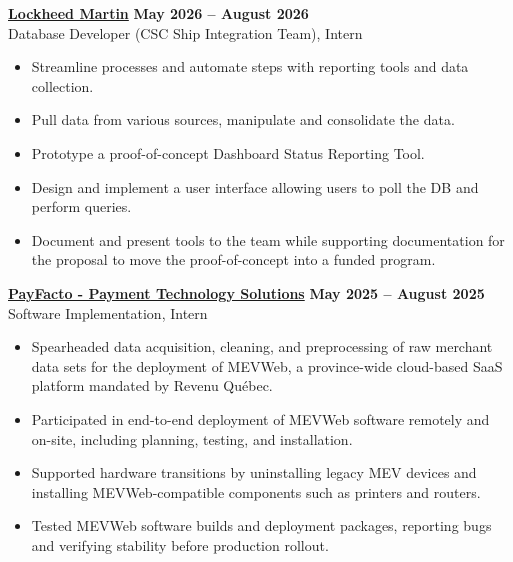 \documentclass[10pt]{article}
\begin{document}
{\href{https://www.lockheedmartin.com}{\textbf{Lockheed Martin}}} \hfill \textbf{ May 2026 -- August 2026} \\
{Database Developer (CSC Ship Integration Team), Intern}
\vspace{-3mm}
\begin{itemize}[left=0.15in, itemsep=0pt]
    \item Streamline processes and automate steps with reporting tools and data collection.
    \item Pull data from various sources, manipulate and consolidate the data.
    \item Prototype a proof-of-concept Dashboard Status Reporting Tool.
    \item Design and implement a user interface allowing users to poll the DB and perform queries.
    \item Document and present tools to the team while supporting documentation for the proposal to move the proof-of-concept into a funded program.
\end{itemize}

{\href{https://www.payfacto.com}{\textbf{PayFacto - Payment Technology Solutions}}} \hfill \textbf{May 2025 -- August 2025} \\
{Software Implementation, Intern }
\vspace{-3mm}
\begin{itemize}[left=0.15in, itemsep=0pt]
    \item Spearheaded data acquisition, cleaning, and preprocessing of raw merchant data sets for the deployment of MEVWeb, a province-wide cloud-based SaaS platform mandated by Revenu Québec.
    \item Participated in end-to-end deployment of MEVWeb software remotely and on-site, including planning, testing, and installation.
    \item Supported hardware transitions by uninstalling legacy MEV devices and installing MEVWeb-compatible components such as printers and routers.
    \item Tested MEVWeb software builds and deployment packages, reporting bugs and verifying stability before production rollout.
\end{itemize}
\end{document}
